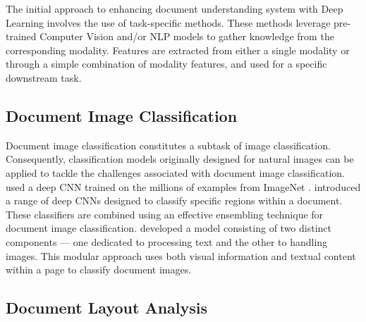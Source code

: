 The initial approach to enhancing document understanding system with Deep Learning involves the use of task-specific methods. These methods leverage pre-trained Computer Vision and/or \ac{NLP} models to gather knowledge from the corresponding modality. Features are extracted from either a single modality or through a simple combination of modality features, and used for a specific downstream task. 




\subsection{Document Image Classification} 

Document image classification constitutes a subtask of image classification. Consequently, classification models originally designed for natural images can be applied to tackle the challenges associated with document image classification. \citet{afzal2015deepdocclassifier} used a deep \ac{CNN} trained on the millions of examples from ImageNet \citep{deng2009imagenet}. \citet{das2018document} introduced a range of deep \acp{CNN} designed to classify specific regions within a document. These classifiers are combined using an effective ensembling technique for document image classification. \citet{dauphinee2019modular}  developed a model consisting of two distinct components — one dedicated to processing text and the other to handling images. This modular approach uses both visual information and textual content within a page to classify document images.

\subsection{Document Layout Analysis} 

